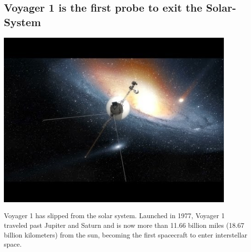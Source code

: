 \documentclass[11pt]{report}
\begin{document}
\subsection{Voyager 1 is the first probe to exit the Solar-System}
\vspace{2mm}\begin{center}\includegraphics[width=12cm]{./img/voyagerLeaving.jpg}\end{center}
Voyager 1 has slipped from the solar system. Launched in 1977, Voyager 1 traveled past Jupiter and Saturn and is now more than 11.66 billion miles (18.67 billion kilometers) from the sun, becoming the first spacecraft to enter interstellar space.
\end{document}
